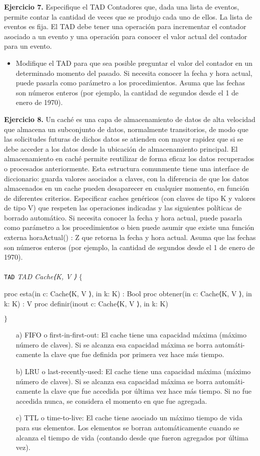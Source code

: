 \documentclass{article}
\newenvironment{tad}[1]{
	\paragraph{} \vspace*{-4mm}
	\newcommand{\obs}[2]{\texttt{obs} ##1 : ##2}

	\vspace{1ex}
	\texttt{TAD} \textit{#1} $\{$
	\par
	\tocarEspacios
}
{

\hspace{2.5mm} $\}$
\vspace{2ex}
}
\begin{document}
\textbf{Ejercicio 7.} Especifique el TAD Contadores que, dada una lista de eventos, permite contar la cantidad de veces que se
produjo cada uno de ellos. La lista de eventos es fija. El TAD debe tener una operaci\'on para incrementar el contador asociado
a un evento y una operaci\'on para conocer el valor actual del contador para un evento.
\begin{itemize}
    \item Modifique el TAD para que sea posible preguntar el valor del contador en un determinado momento del pasado. Si necesita conocer la fecha y hora actual, puede pasarla como par\'ametro a los procedimientos. Asuma que las fechas son n\'umeros enteros (por ejemplo, la cantidad de segundos desde el 1 de enero de 1970).
\end{itemize}

\textbf{Ejercicio 8.} Un cach\'e es una capa de almacenamiento de datos de alta velocidad que almacena un subconjunto de datos,
normalmente transitorios, de modo que las solicitudes futuras de dichos datos se atienden con mayor rapidez que si se debe
acceder a los datos desde la ubicaci\'on de almacenamiento principal. El almacenamiento en cach\'e permite reutilizar de forma
eficaz los datos recuperados o procesados anteriormente.
Esta estructura comunmente tiene una interface de diccionario: guarda valores asociados a claves, con la diferencia de
que los datos almacenados en un cache pueden desaparecer en cualquier momento, en funci\'on de diferentes criterios.
Especificar caches gen\'ericos (con claves de tipo K y valores de tipo V) que respeten las operaciones indicadas y las
siguientes pol\'iticas de borrado autom\'atico. Si necesita conocer la fecha y hora actual, puede pasarla como par\'ametro a los
procedimientos o bien puede asumir que existe una funci\'on externa horaActual() : Z que retorna la fecha y hora actual.
Asuma que las fechas son n\'umeros enteros (por ejemplo, la cantidad de segundos desde el 1 de enero de 1970).
\begin{tad}{TAD Cache⟨K, V ⟩}
    proc esta(in c: Cache⟨K, V ⟩, in k: K) : Bool
    proc obtener(in c: Cache⟨K, V ⟩, in k: K) : V
    proc definir(inout c: Cache⟨K, V ⟩, in k: K)
\end{tad}
\begin{itemize}
    \item [a)] FIFO o first-in-first-out:
    El cache tiene una capacidad m\'axima (m\'aximo n\'umero de claves). Si se alcanza esa capacidad m\'axima se borra autom\'ati-
    camente la clave que fue definida por primera vez hace m\'as tiempo.
    \item [b)] LRU o last-recently-used:
    El cache tiene una capacidad m\'axima (m\'aximo n\'umero de claves). Si se alcanza esa capacidad m\'axima se borra autom\'ati-
    camente la clave que fue accedida por \'ultima vez hace m\'as tiempo. Si no fue accedida nunca, se considera el momento en
    que fue agregada.
    \item [c)] TTL o time-to-live:
    El cache tiene asociado un m\'aximo tiempo de vida para sus elementos. Los elementos se borran autom\'aticamente cuando
    se alcanza el tiempo de vida (contando desde que fueron agregados por \'ultima vez).
\end{itemize}
\end{document}

